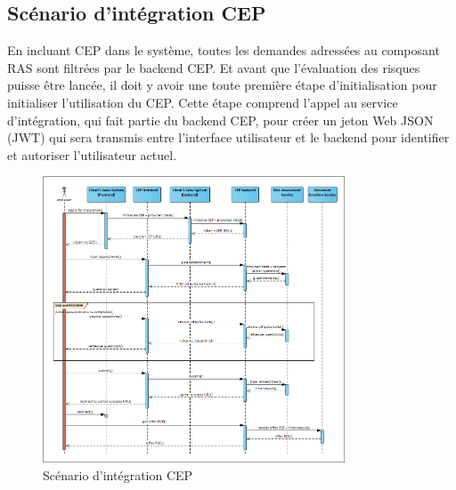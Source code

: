 \subsection{Scénario d'intégration CEP}
En incluant CEP dans le système, toutes les demandes adressées au composant RAS sont filtrées par le backend CEP. Et avant que l'évaluation des risques puisse être lancée, il doit y avoir une toute première étape d'initialisation pour initialiser l'utilisation du CEP. Cette étape comprend l'appel au service d'intégration, qui fait partie du backend CEP, pour créer un jeton Web JSON (JWT) qui sera transmis entre l'interface utilisateur et le backend pour identifier et autoriser l'utilisateur actuel.
 \begin{figure}[H]
            \centering
                \includegraphics[width=0.8\textwidth]{Figures/cepreflex}
	       \decoRule
		\caption[Scénario d'intégration CEP]{Scénario d'intégration CEP}
\label{fig:Cep}
\end{figure}
